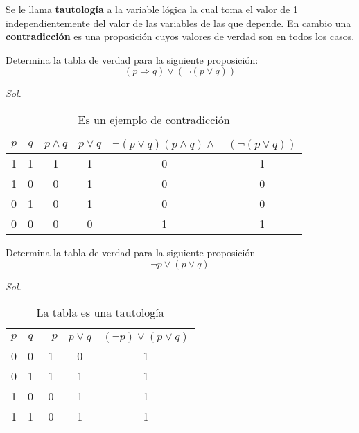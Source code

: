 Se le llama \textbf{tautología} a la variable lógica la cual toma el valor de 1 independientemente del valor de las variables de las que depende. En cambio una \textbf{contradicción} es una proposición cuyos valores de verdad son  en todos los casos.

\begin{example}
	Determina la tabla de verdad para la siguiente proposición:
	\begin{equation*}
		(p \Rightarrow q) \lor (\lnot (p \lor q))
	\end{equation*}
\end{example}
\textit{ Sol. }

\begin{table}[h!]
	\centering
	\begin{tabular}{|c|c|c|c|c|c|}
		\hline
		$p$ & $q$ & $p \land q$ & $p\lor q$ & $\lnot (p \lor q)(p \land q)\land$ & $(\lnot(p \lor q))$ \\ \hline
		1   & 1   & 1           & 1         & 0                                  & 1                   \\
		1   & 0   & 0           & 1         & 0                                  & 0                   \\
		0   & 1   & 0           & 1         & 0                                  & 0                   \\
		0   & 0   & 0           & 0         & 1                                  & 1                   \\ \hline
	\end{tabular}
	\caption{Es un ejemplo de contradicción}
	\label{tabfmc11}
\end{table}

\begin{example}
	Determina la tabla de verdad para la siguiente proposición
	\begin{equation*}
		\lnot p \lor (p\lor q)
	\end{equation*}
\end{example}
\textit{ Sol. }

\begin{table}[h!]
	\centering
	\begin{tabular}{|c|c|c|c|c|}
		\hline
		$p$ & $q$ & $\lnot p$ & $p \lor q$ & $(\lnot p) \lor(p \lor q)$ \\ \hline
		0   & 0   & 1         & 0          & 1                          \\
		0   & 1   & 1         & 1          & 1                          \\
		1   & 0   & 0         & 1          & 1                          \\
		1   & 1   & 0         & 1          & 1                          \\ \hline
	\end{tabular}
	\caption{La tabla es una tautología}
	\label{tabfmc12}
\end{table}

